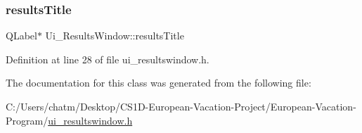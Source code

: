 \subsubsection{\texorpdfstring{resultsTitle}{resultsTitle}}
{\footnotesize\ttfamily Q\+Label$\ast$ Ui\+\_\+\+Results\+Window\+::results\+Title}



Definition at line 28 of file ui\+\_\+resultswindow.\+h.



The documentation for this class was generated from the following file\+:\begin{DoxyCompactItemize}
\item 
C\+:/\+Users/chatm/\+Desktop/\+C\+S1\+D-\/\+European-\/\+Vacation-\/\+Project/\+European-\/\+Vacation-\/\+Program/\mbox{\hyperlink{ui__resultswindow_8h}{ui\+\_\+resultswindow.\+h}}\end{DoxyCompactItemize}
